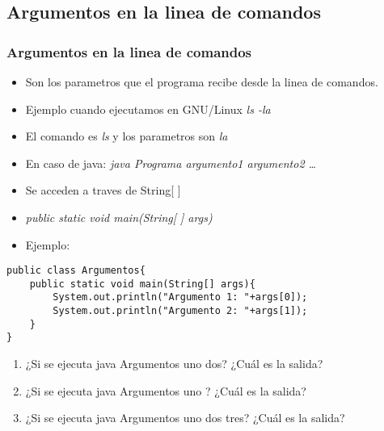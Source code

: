 \documentclass{beamer}
\begin{document}
\subsection{Argumentos en la linea de comandos}
\begin{frame}[fragile]
\frametitle{Argumentos en la linea de comandos}
\begin{itemize}[<+-|alert@+>]
\item Son los parametros que el programa recibe desde la linea de comandos.
\item Ejemplo cuando ejecutamos en GNU/Linux \emph{ls -la}
\item El comando es \emph{ls} y los parametros son \emph{la}
\item En caso de java: \emph{java Programa argumento1 argumento2 \dots}
\item Se acceden a traves de String[ ]
\item \emph{public static void main(String[ ] args)}
\item Ejemplo:
\end{itemize}
\pause
\begin{verbatim}
public class Argumentos{
    public static void main(String[] args){
        System.out.println("Argumento 1: "+args[0]);
        System.out.println("Argumento 2: "+args[1]);
    }
}
\end{verbatim}
\begin{footnotesize}
\pause
\begin{enumerate}[<+->]
\item ¿Si se ejecuta java Argumentos uno dos? ¿Cuál es la salida?
\item ¿Si se ejecuta java Argumentos uno ? ¿Cuál es la salida?
\item ¿Si se ejecuta java Argumentos uno dos tres? ¿Cuál es la salida?
\end{enumerate}
\end{footnotesize}
\pause
\end{frame}
\end{document}
